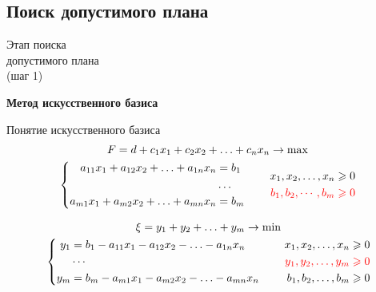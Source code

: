 \documentclass[unicode,11pt,notheorems]{beamer}
\begin{document}
\subsection{Поиск допустимого плана}
\begin{frame}{}{}
\centering 
\Large Этап поиска\\ допустимого плана\\ (шаг 1)

{\bfseries \color{vgublue} Метод искусственного базиса}
\end{frame}

\begin{frame}{Понятие искусственного базиса}{}
$$
\begin{gathered}
  F=d+c_1x_1+c_2x_2+\ldots+c_n x_n  \to \max
\\
  \left\lbrace
  \begin{aligned}
	  a_{11} x_1 + a_{12} x_2 + \ldots + a_{1n} x_n & = b_1\\
	  &\ldots\\
	  a_{m1} x_1 + a_{m2} x_2 + \ldots + a_{mn} x_n & = b_m
  \end{aligned}
  \right.
  \qquad 
  \begin{aligned}
	  x_1, x_2, \ldots, x_n &\geqslant 0\\
	  \color{red} b_1, b_2, \cdots, b_m & \color{red} \geqslant 0\\
  \end{aligned}
\end{gathered}
$$

$$
\begin{gathered}
	\xi =y_1+y_2+\ldots+y_m  \to \min
\\
	\left\lbrace
	\begin{aligned}
		y_1 &= b_1-a_{11} x_1 - a_{12} x_2 - \ldots - a_{1n} x_n \\
		&\cdots\\
		y_m &= b_m-a_{m1} x_1 - a_{m2} x_2 - \ldots - a_{mn} x_n \\
	\end{aligned}
	\right.
	\qquad 
	\begin{aligned}
		x_1, x_2, \ldots, x_n &\geqslant 0\\
		\color{red} y_1, y_2, \ldots, y_m & \color{red} \geqslant 0\\
		b_1, b_2, \ldots, b_m & \geqslant 0\\  
  \end{aligned}
\end{gathered}
$$

\end{frame}
\end{document}
